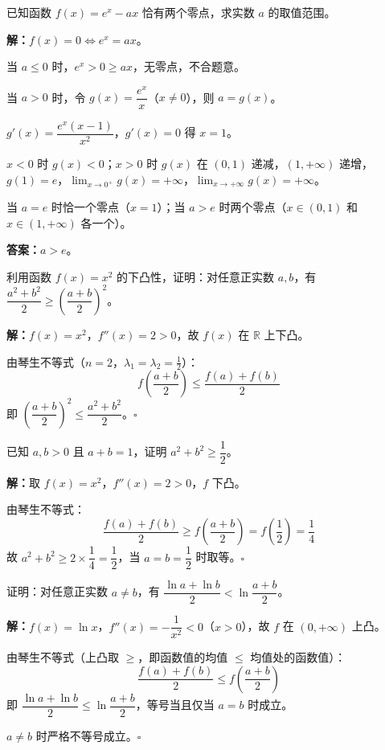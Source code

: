 \documentclass[12pt, a4paper]{ctexart}
\begin{document}
\begin{examplebox}[【例题3】零点与参数问题]
已知函数 $f(x)=e^x-ax$ 恰有两个零点，求实数 $a$ 的取值范围。
\end{examplebox}

\textbf{解：}\quad $f(x)=0 \Leftrightarrow e^x=ax$。\par
当 $a\leq 0$ 时，$e^x>0\geq ax$，无零点，不合题意。\par
当 $a>0$ 时，令 $g(x)=\dfrac{e^x}{x}$（$x\neq 0$），则 $a=g(x)$。\par
$g'(x)=\dfrac{e^x(x-1)}{x^2}$，$g'(x)=0$ 得 $x=1$。\par
$x<0$ 时 $g(x)<0$；$x>0$ 时 $g(x)$ 在 $(0,1)$ 递减，$(1,+\infty)$ 递增，$g(1)=e$，$\lim_{x\to 0^+}g(x)=+\infty$，$\lim_{x\to+\infty}g(x)=+\infty$。\par
当 $a=e$ 时恰一个零点（$x=1$）；当 $a>e$ 时两个零点（$x\in(0,1)$ 和 $x\in(1,+\infty)$ 各一个）。\par
\textbf{答案：}$a>e$。

\begin{examplebox}[【例题4】琴生不等式证明均值不等式]
利用函数 $f(x)=x^2$ 的下凸性，证明：对任意正实数 $a,b$，有 $\dfrac{a^2+b^2}{2}\geq\left(\dfrac{a+b}{2}\right)^2$。
\end{examplebox}

\textbf{解：}\quad $f(x)=x^2$，$f''(x)=2>0$，故 $f(x)$ 在 $\mathbb{R}$ 上下凸。\par
由琴生不等式（$n=2$，$\lambda_1=\lambda_2=\frac{1}{2}$）：
\[
f\!\left(\frac{a+b}{2}\right)\leq \frac{f(a)+f(b)}{2}
\]
即 $\left(\dfrac{a+b}{2}\right)^2\leq \dfrac{a^2+b^2}{2}$。\hfill$\square$

\begin{examplebox}[【例题5】凹凸性证明不等式]
已知 $a,b>0$ 且 $a+b=1$，证明 $a^2+b^2\geq \dfrac{1}{2}$。
\end{examplebox}

\textbf{解：}\quad 取 $f(x)=x^2$，$f''(x)=2>0$，$f$ 下凸。\par
由琴生不等式：
\[
\frac{f(a)+f(b)}{2}\geq f\!\left(\frac{a+b}{2}\right)=f\!\left(\frac{1}{2}\right)=\frac{1}{4}
\]
故 $a^2+b^2\geq 2\times\dfrac{1}{4}=\dfrac{1}{2}$，当 $a=b=\dfrac{1}{2}$ 时取等。\hfill$\square$

\begin{examplebox}[【例题6】利用 $\ln x$ 的上凸性证明不等式]
证明：对任意正实数 $a\neq b$，有 $\dfrac{\ln a+\ln b}{2}<\ln\dfrac{a+b}{2}$。
\end{examplebox}

\textbf{解：}\quad $f(x)=\ln x$，$f''(x)=-\dfrac{1}{x^2}<0$（$x>0$），故 $f$ 在 $(0,+\infty)$ 上凸。\par
由琴生不等式（上凸取 $\geq$，即函数值的均值 $\leq$ 均值处的函数值）：
\[
\frac{f(a)+f(b)}{2}\leq f\!\left(\frac{a+b}{2}\right)
\]
即 $\dfrac{\ln a+\ln b}{2}\leq \ln\dfrac{a+b}{2}$，等号当且仅当 $a=b$ 时成立。\par
$a\neq b$ 时严格不等号成立。\hfill$\square$
\end{document}
